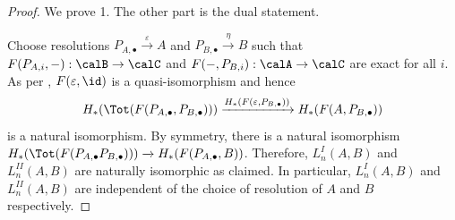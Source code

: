 \begin{proof}

    We prove 1. The other part is the dual statement.

    Choose resolutions $P_{A,\bullet} \xrightarrow{\varepsilon} A$ and $P_{B,\bullet} \xrightarrow{\eta} B$ such that $F(P_{A,i}, -): \calB \to \calC$ and $F(-, P_{B,i}): \calA \to \calC$ are exact for all $i$. As per , $F(\varepsilon, \id)$ is a quasi-isomorphism and hence 
    $$H_*(\Tot(F(P_{A,\bullet}, P_{B,\bullet}))) \xrightarrow{H_*(F(\varepsilon, P_{B,\bullet}))} H_*(F(A, P_{B,\bullet}))$$
    is a natural isomorphism.  By symmetry, there is a natural isomorphism $H_*(\Tot(F(P_{A,\bullet} P_{B,\bullet}))) \xrightarrow{} H_*(F(P_{A,\bullet}, B))$. Therefore, $L_n^I(A,B)$ and $L_n^{II}(A,B)$ are naturally isomorphic as claimed. In particular, $L_n^{I}(A,B)$ and $L_n^{II}(A,B)$ are independent of the choice of resolution of $A$ and $B$ respectively.

\end{proof}
